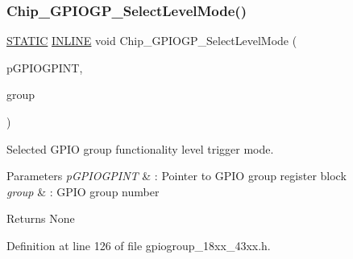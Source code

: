 \subsubsection{\texorpdfstring{Chip\+\_\+\+G\+P\+I\+O\+G\+P\+\_\+\+Select\+Level\+Mode()}{Chip\_GPIOGP\_SelectLevelMode()}}
{\footnotesize\ttfamily \hyperlink{group___l_p_c___types___public___macros_ga10b2d890d871e1489bb02b7e70d9bdfb}{S\+T\+A\+T\+IC} \hyperlink{spifi__18xx__43xx_8h_a2eb6f9e0395b47b8d5e3eeae4fe0c116}{I\+N\+L\+I\+NE} void Chip\+\_\+\+G\+P\+I\+O\+G\+P\+\_\+\+Select\+Level\+Mode (\begin{DoxyParamCaption}\item[{\hyperlink{struct_l_p_c___g_p_i_o_g_r_o_u_p_i_n_t___t}{L\+P\+C\+\_\+\+G\+P\+I\+O\+G\+R\+O\+U\+P\+I\+N\+T\+\_\+T} $\ast$}]{p\+G\+P\+I\+O\+G\+P\+I\+NT,  }\item[{uint8\+\_\+t}]{group }\end{DoxyParamCaption})}



Selected G\+P\+IO group functionality level trigger mode. 


\begin{DoxyParams}{Parameters}
{\em p\+G\+P\+I\+O\+G\+P\+I\+NT} & \+: Pointer to G\+P\+IO group register block \\
\hline
{\em group} & \+: G\+P\+IO group number \\
\hline
\end{DoxyParams}
\begin{DoxyReturn}{Returns}
None 
\end{DoxyReturn}


Definition at line 126 of file gpiogroup\+\_\+18xx\+\_\+43xx.\+h.

\mbox{\label{group___g_p_i_o_g_p__18_x_x__43_x_x_ga230ad2c0745d1be272cbea3ac83a5925}} 
